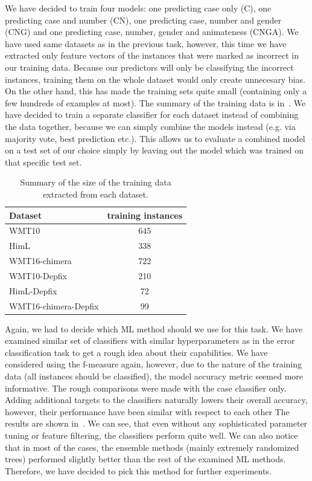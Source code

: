 We have decided to train four models: one predicting case only (C), one predicting case and number (CN),
 one predicting case, number and gender (CNG) and one predicting case, number, gender and animateness (CNGA).
We have used same datasets as in the previous task, however, this
time we have extracted only feature vectors of the instances that were marked as incorrect in our training data. Because
our predictors will only be classifying the incorrect instances, training them on the whole dataset would only create
unnecesary bias. On the other hand, this has made the training sets quite small (containing only a few hundreds of examples
at most). The summary of the training data is in~. We have decided to train a separate classifier
for each dataset instead of combining the data together, because we can simply combine the models instead (e.g. via majority
vote, best prediction etc.). This allows us to evaluate a combined model on a test set of our choice simply by leaving
out the model which was trained on that specific test set.

\begin{table}[t]
\centering
\small

\begin{tabular}{lc}
Dataset  &  \hash{} training instances  \\
\hline
WMT10  &  645  \\
HimL  & 338  \\
WMT16-chimera  &  722  \\
WMT10-Depfix  &  210  \\
HimL-Depfix  &  72  \\
WMT16-chimera-Depfix  &  99  \\
\end{tabular}
\caption{
    Summary of the size of the training data extracted from each dataset.
}
\label{cats-training-sum}
\end{table}

Again, we had to decide which ML method should we use for this task. 
We have examined similar set of classifiers with similar
hyperparameters as in the error classification task to get a rough idea about their capabilities.
We have considered using the f-measure again, however, due to the nature of the training data (all
instances should be classified), the model accuracy metric seemed more informative.
The rough comparisons were made with the case classifier only.
Adding additional targets to the classifiers naturally lowers their overall accuracy,
however, their performance have been similar with respect to each other
The results are shown in~. We can see, that even without any sophisticated parameter
tuning or feature filtering, the classifiers perform quite well. We can also notice that in most of the cases, the ensemble
methods (mainly extremely randomized trees) performed slightly better than the rest of the examined ML methods. Therefore, we have decided
to pick this method for further experiments.

